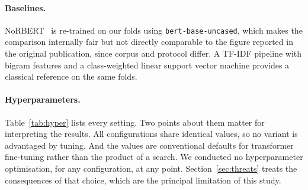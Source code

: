 \documentclass[11pt,a4paper]{article}
\begin{document}
\paragraph{Baselines.}
NoRBERT~\cite{hey2020} is re-trained on our folds using \texttt{bert-base-uncased}, which
makes the comparison internally fair but not directly comparable to the figure reported in
the original publication, since corpus and protocol differ. A TF-IDF pipeline with bigram
features and a class-weighted linear support vector machine provides a classical reference
on the same folds.

\paragraph{Hyperparameters.}
Table~\ref{tab:hyper} lists every setting. Two points about them matter for interpreting
the results. All configurations share identical values, so no variant is advantaged by
tuning. And the values are conventional defaults for transformer fine-tuning rather than the product of a search. We conducted no hyperparameter optimisation, for any
configuration, at any point. Section~\ref{sec:threats} treats the consequences of that
choice, which are the principal limitation of this study.
\end{document}
